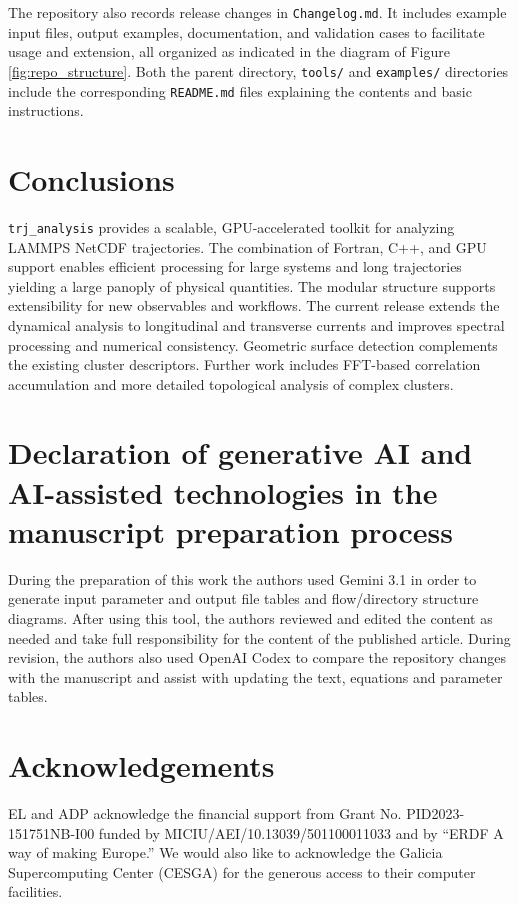 \documentclass[final,1p,times]{elsarticle}
\begin{document}
The repository also records release changes in \texttt{Changelog.md}. It includes example input files, output examples,
documentation, and validation cases to facilitate usage and extension,
all organized as indicated in the diagram of Figure
\ref{fig:repo_structure}. Both the parent directory, {\tt tools/} and
{\tt examples/} directories include the corresponding {\tt README.md}
files explaining the contents and basic instructions. 

\section{Conclusions}

\texttt{trj\_analysis} provides a scalable, GPU-accelerated toolkit
for analyzing LAMMPS NetCDF trajectories. The combination of Fortran,
C++, and GPU support enables efficient processing for large systems
and long trajectories yielding a large panoply of physical
quantities. The modular structure supports extensibility 
for new observables and workflows. The current release extends the dynamical analysis to longitudinal and transverse currents and improves spectral processing and numerical consistency. Geometric surface detection complements the existing cluster descriptors. Further work includes FFT-based correlation accumulation and more detailed topological analysis of complex clusters. 

\section{Declaration of generative AI and AI-assisted technologies in
  the manuscript preparation process} 

During the preparation of this work the authors used Gemini 3.1 in
order to generate input parameter and output file tables and
flow/directory structure diagrams. After using this tool, the authors
reviewed and edited the content as needed and take full
responsibility for the content of the published article. During revision, the authors also used OpenAI Codex to compare the repository changes with the manuscript and assist with updating the text, equations and parameter tables. 

\section*{Acknowledgements}

EL and ADP acknowledge the financial support from Grant No. PID2023-151751NB-I00 funded by MICIU/AEI/10.13039/501100011033 and by ``ERDF A way of making Europe.'' We would also like to acknowledge the Galicia Supercomputing Center (CESGA) for the generous access to their computer facilities.



\end{document}

